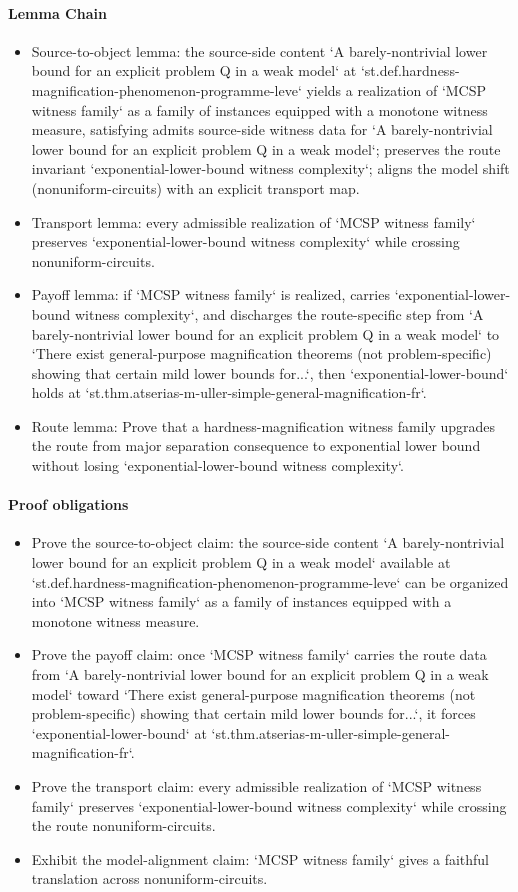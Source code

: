 \documentclass[11pt]{article}
\begin{document}
\paragraph{Lemma Chain}
\begin{itemize}
\item Source-to-object lemma: the source-side content `A barely-nontrivial lower bound for an explicit problem Q in a weak model` at `st.def.hardness-magnification-phenomenon-programme-leve` yields a realization of `MCSP witness family` as a family of instances equipped with a monotone witness measure, satisfying admits source-side witness data for `A barely-nontrivial lower bound for an explicit problem Q in a weak model`; preserves the route invariant `exponential-lower-bound witness complexity`; aligns the model shift (nonuniform-circuits) with an explicit transport map.
\item Transport lemma: every admissible realization of `MCSP witness family` preserves `exponential-lower-bound witness complexity` while crossing nonuniform-circuits.
\item Payoff lemma: if `MCSP witness family` is realized, carries `exponential-lower-bound witness complexity`, and discharges the route-specific step from `A barely-nontrivial lower bound for an explicit problem Q in a weak model` to `There exist general-purpose magnification theorems (not problem-specific) showing that certain mild lower bounds for...`, then `exponential-lower-bound` holds at `st.thm.atserias-m-uller-simple-general-magnification-fr`.
\item Route lemma: Prove that a hardness-magnification witness family upgrades the route from major separation consequence to exponential lower bound without losing `exponential-lower-bound witness complexity`.
\end{itemize}
\paragraph{Proof obligations}
\begin{itemize}
\item Prove the source-to-object claim: the source-side content `A barely-nontrivial lower bound for an explicit problem Q in a weak model` available at `st.def.hardness-magnification-phenomenon-programme-leve` can be organized into `MCSP witness family` as a family of instances equipped with a monotone witness measure.
\item Prove the payoff claim: once `MCSP witness family` carries the route data from `A barely-nontrivial lower bound for an explicit problem Q in a weak model` toward `There exist general-purpose magnification theorems (not problem-specific) showing that certain mild lower bounds for...`, it forces `exponential-lower-bound` at `st.thm.atserias-m-uller-simple-general-magnification-fr`.
\item Prove the transport claim: every admissible realization of `MCSP witness family` preserves `exponential-lower-bound witness complexity` while crossing the route nonuniform-circuits.
\item Exhibit the model-alignment claim: `MCSP witness family` gives a faithful translation across nonuniform-circuits.
\end{itemize}
\end{document}
